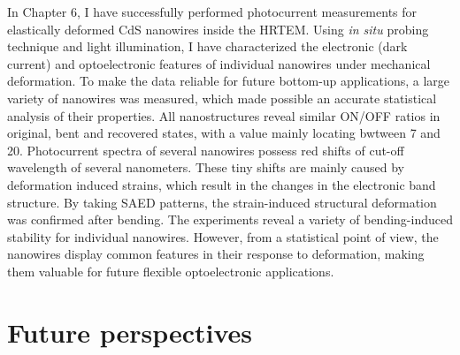 In Chapter 6, I have successfully performed photocurrent measurements for elastically deformed CdS nanowires inside the HRTEM. Using {\it in situ}  probing technique and light illumination, I have characterized the electronic (dark current) and optoelectronic features of individual nanowires under mechanical deformation. 
To make the data reliable for future bottom-up applications, a large variety of nanowires was measured, which made possible an accurate statistical analysis of their properties. 
All nanostructures reveal similar ON/OFF ratios in original, bent and recovered states, with a value mainly locating bwtween 7 and 20. 
Photocurrent spectra of several nanowires possess red shifts of cut-off wavelength of several nanometers. 
These tiny shifts are mainly caused by deformation induced strains, which result in the changes in the electronic band structure. 
By taking SAED patterns, the strain-induced structural deformation was confirmed after bending. 
The experiments reveal a variety of bending-induced stability for individual nanowires. However, from a statistical point of view, the nanowires display common features in their response to deformation, making them valuable for future flexible optoelectronic applications. \\

\section{Future perspectives}



